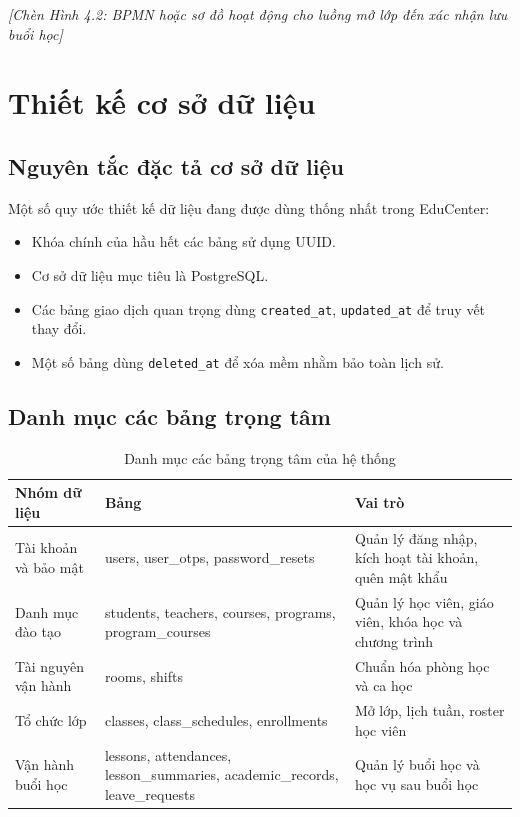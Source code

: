 \documentclass[../DoAn.tex]{subfiles}
\begin{document}
\textit{[Chèn Hình 4.2: BPMN hoặc sơ đồ hoạt động cho luồng mở lớp đến xác nhận lưu buổi học]}

\section{Thiết kế cơ sở dữ liệu}
\label{section:4.3}

\subsection{Nguyên tắc đặc tả cơ sở dữ liệu}

Một số quy ước thiết kế dữ liệu đang được dùng thống nhất trong EduCenter:
\begin{itemize}
    \item Khóa chính của hầu hết các bảng sử dụng UUID.
    \item Cơ sở dữ liệu mục tiêu là PostgreSQL.
    \item Các bảng giao dịch quan trọng dùng \texttt{created\_at}, \texttt{updated\_at} để truy vết thay đổi.
    \item Một số bảng dùng \texttt{deleted\_at} để xóa mềm nhằm bảo toàn lịch sử.
\end{itemize}

\subsection{Danh mục các bảng trọng tâm}

\begin{table}[H]
\centering
\caption{Danh mục các bảng trọng tâm của hệ thống}
\label{table:bang4.1}
\begin{tabular}{|l|p{4cm}|p{6cm}|}
\hline
\textbf{Nhóm dữ liệu} & \textbf{Bảng} & \textbf{Vai trò} \\ \hline
Tài khoản và bảo mật & users, user\_otps, password\_resets & Quản lý đăng nhập, kích hoạt tài khoản, quên mật khẩu \\ \hline
Danh mục đào tạo & students, teachers, courses, programs, program\_courses & Quản lý học viên, giáo viên, khóa học và chương trình \\ \hline
Tài nguyên vận hành & rooms, shifts & Chuẩn hóa phòng học và ca học \\ \hline
Tổ chức lớp & classes, class\_schedules, enrollments & Mở lớp, lịch tuần, roster học viên \\ \hline
Vận hành buổi học & lessons, attendances, lesson\_summaries, academic\_records, leave\_requests & Quản lý buổi học và học vụ sau buổi học \\ \hline
\end{tabular}
\end{table}
\end{document}
